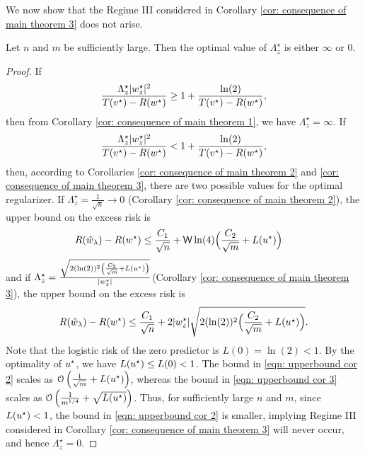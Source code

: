 We now show that the Regime III considered in Corollary \ref{cor: consequence of main theorem 3} does not arise.

\begin{corollary}
Let $n$ and $m$ be sufficiently large. Then the optimal value of $\Lambda^\star_z$ is either $\infty$ or $0$.
\end{corollary}

\begin{proof}
If
\begin{equation*}
    \frac{\Lambda_z^\star|w^\star_z|^2}{T(v^\star) - R(w^\star)} \geq 1+\frac{\ln(2)}{T(v^\star) - R(w^\star)},
\end{equation*}
then from Corollary \ref{cor: consequence of main theorem 1}, we have $\Lambda^\star_z = \infty$.
If
\begin{equation*}
    \frac{\Lambda_z^\star|w^\star_z|^2}{T(v^\star) - R(w^\star)} < 1+\frac{\ln(2)}{T(v^\star) - R(w^\star)},
\end{equation*}
then, according to Corollaries \ref{cor: consequence of main theorem 2} and \ref{cor: consequence of main theorem 3}, there are two possible values for the optimal regularizer.
If $\Lambda^\star_z = \frac{1}{\sqrt{n}} \to 0$ (Corollary \ref{cor: consequence of main theorem 2}), the upper bound on the excess risk is
\begin{equation}\label{eqn: upperbound cor 2}
\begin{aligned}
    R(\hat{w}_\lambda) - R(w^\star) &\leq \frac{C_1}{\sqrt{n}} + \mathsf{W}\ln(4)\Big(\frac{C_2}{\sqrt{m}} + L(u^\star)\Big)
\end{aligned}
\end{equation}
and if $\Lambda_z^\star = \frac{\sqrt{2(\ln(2))^2\left(\frac{C_2}{\sqrt{m}} +L(u^\star)\right)}}{|w^\star_z|}$(Corollary \ref{cor: consequence of main theorem 3}), the upper bound on the excess risk is
\begin{equation}\label{eqn: upperbound cor 3}
    R(\hat{w}_\lambda) - R(w^\star) \leq \frac{C_1}{\sqrt{n}} + 2|w^\star_z|\sqrt{2(\ln(2))^2\Big(\frac{C_2}{\sqrt{m}} +L(u^\star)\Big)}.
\end{equation}
Note that the logistic risk of the zero predictor is $L(0) = \ln(2) < 1$. By the optimality of $u^\star$, we have $L(u^\star) \leq L(0) < 1$. The bound in \eqref{eqn: upperbound cor 2} scales as $\mathcal{O}\left(\frac{1}{\sqrt{m}} + L(u^\star)\right)$, whereas the bound in \eqref{eqn: upperbound cor 3} scales as $\mathcal{O}\left(\frac{1}{m^{1/4}} + \sqrt{L(u^\star)}\right)$. Thus, for sufficiently large $n$ and $m$, since $L(u^\star) < 1$, the bound in \eqref{eqn: upperbound cor 2} is smaller, implying Regime III considered in Corollary \ref{cor: consequence of main theorem 3} will never occur, and hence $\Lambda^\star_z = 0$.



\end{proof}


